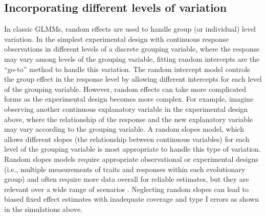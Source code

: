 \documentclass[12pt]{article}
\begin{document}
\subsection*{Incorporating different levels of variation}


In classic GLMMs, random effects are used to handle group (or individual) level variation. 
In the simplest experimental design with continuous response observations in different levels of a discrete grouping variable, where the response may vary among levels of the grouping variable, fitting random intercepts are the ``go-to'' method to handle this variation.
The random intercept model controls the group effect in the response level by allowing different intercepts for each level of the grouping variable.
However, random effects can take more complicated forms as the experimental design becomes more complex.  
For example, imagine observing another continuous explanatory variable in the experimental design above, where the relationship of the response and the new explanatory variable may vary according to the grouping variable.
A random slopes model, which allows different slopes (the relationship between continuous variables) for each level of the grouping variable is most appropriate to handle this type of variation.
Random slopes models require appropriate observational or experimental designs (i.e., multiple measurements of traits and responses within each evolutionary group) and often require more data overall for reliable estimates, but they are relevant over a wide range of scenarios \citep{schielzeth2008conclusions, cleasby2015quantifying,ord2010adaptation}.
Neglecting random slopes can lead to biased fixed effect estimates with inadequate coverage and type I errors \citep{schielzeth2008conclusions} as shown in the simulations above.
\end{document}
